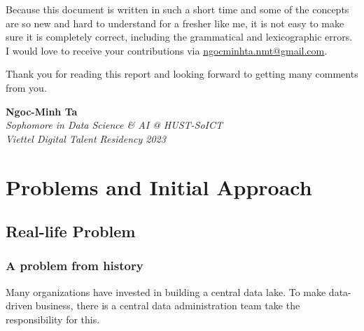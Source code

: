 \documentclass[12pt, a4paper]{book}
\begin{document}
Because this document is written in such a short time and some of the concepts are so new and hard to understand for a fresher like me, it is not easy to make sure it is completely correct, including the grammatical and lexicographic errors. I would love to receive your contributions via \underline{\href{mailto:ngocminhta.nmt@gmail.com}{ngocminhta.nmt@gmail.com}}.

Thank you for reading this report and looking forward to getting many comments from you.\\
\vspace{0.5cm}

\raggedleft
\textbf{Ngoc-Minh Ta}\\
\textit{Sophomore in Data Science \& AI @ HUST-SoICT} \\
\textit{Viettel Digital Talent Residency 2023}

\justifying
{}

        \tableofcontents
        
        \listoffigures
        
        \let\cleardoublepage\clearpage
        
        \listoftables
        
        
        \let\cleardoublepage\clearpage
    \endgroup
    
    \begingroup
        \frontmatter
        \justifying
        \let\cleardoublepage\clearpage
    \endgroup
    
    \mainmatter
    \justifying
    \normalsize
\chapter{Problems and Initial Approach}

\section{Real-life Problem}
\subsection{A problem from history}
Many organizations have invested in building a central data lake. To make data-driven business, there is a central data administration team take the responsibility for this.
\end{document}
